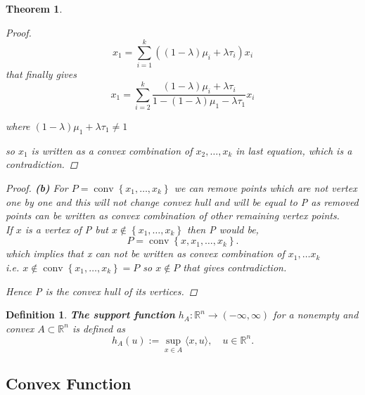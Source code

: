 \documentclass[oneside]{book}
\newtheorem{theorem}{Theorem}[section]
\newtheorem{mydef}{Definition}[section]
\begin{document}
\begin{theorem}
\begin{proof}
			\begin{equation} 
				\label{eq38}
				x_{1}=\sum_{i=1}^{k}\left((1-\lambda) \mu_{i}+\lambda \tau_{i}\right) x_{i}
			\end{equation}
			that finally gives 
			\begin{equation} 
				\label{eq39}
				x_{1}=\sum_{i=2}^{k} \frac{(1-\lambda) \mu_{i}+\lambda \tau_{i}}{1-(1-\lambda) \mu_{1}-\lambda \tau_{1}} x_{i}
			\end{equation}
			
			where $(1-\lambda) \mu_{1}+\lambda \tau_{1} \neq 1$ \par
			so $x_{1}$ is written as a convex combination of $x_{2}, \ldots, x_{k}$ in last equation, which is  a contradiction.
		\end{proof}
		
		\begin{proof}    \textbf{(b)}  For $P=\operatorname{conv}\left\{x_{1}, \ldots, x_{k}\right\}$ we can remove points  which are not vertex  
			one by one and this will not change convex hull and will be equal to P as removed points can be written as convex combination of other remaining vertex points. \\
			If $x$ is a vertex of P but $x \notin \left\{x_{1}, \ldots, x_{k}\right\} $ then P would be,
			$$P=\operatorname{conv}\left\{x,x_{1}, \ldots, x_{k}\right\}.$$ 
			which implies that x can not be written as convex combination of $x_{1}, \ldots x_{k}$ \\ i.e. 
			$x \notin  \operatorname{conv} \left\{x_{1}, \ldots, x_{k}\right\} = P  $ so $x \notin P$ that gives contradiction.\par
			Hence P is the convex hull of its vertices.
		\end{proof}
		
		
	\end{theorem}
	
	
	\begin{mydef}\label{d:8}
		\textbf{The support function }$h_{A}: \mathbb{R}^{n} \rightarrow(-\infty, \infty) $  for a nonempty and convex $A \subset \mathbb{R}^{n}$ is defined as
		$$
		h_{A}(u):=\sup _{x \in A}\langle x, u\rangle, \quad u \in \mathbb{R}^{n}.
		$$
		
	\end{mydef}
	
	
	
	\subsection{Convex Function}
	\label{ss:17}
	
\end{document}
